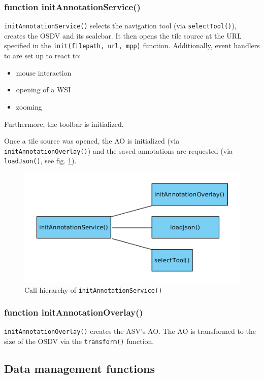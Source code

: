 \subsubsection{function initAnnotationService()}
\texttt{initAnnotationService()} selects the navigation tool (via \texttt{selectTool()}), creates the OSDV and its scalebar. It then opens the tile source at the URL specified in the \texttt{init(file{\textunderscore}path, url, mpp)} function. Additionally, event handlers to are set up to react to:
\begin{itemize}
	\item mouse interaction
	\item opening of a WSI
	\item zooming
\end{itemize}
Furthermore, the toolbar is initialized.

Once a tile source was opened, the AO is initialized (via \texttt{initAnnotationOverlay()}) and the saved annotations are requested (via \texttt{loadJson()}, see fig. \ref{figB_initAS}).

\begin{figure}[H]
	\begin{center}
		\includegraphics[scale=0.5]{img/ch_initAS.png}
		\caption{Call hierarchy of \texttt{initAnnotationService()}}
		\label{figB_initAS}
	\end{center}
\end{figure}


\subsubsection{function initAnnotationOverlay()}
\texttt{initAnnotationOverlay()} creates the ASV's AO. The AO is transformed to the size of the OSDV via the \texttt{transform()} function.


\subsection{Data management functions}


